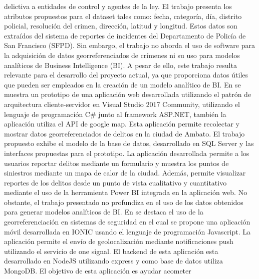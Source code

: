 delictiva a entidades de control y agentes de la ley. El trabajo presenta los atributos propuestos para el dataset tales como:
fecha, categoría, día, distrito policial, resolución del crimen, dirección, latitud y longitud. Estos datos son extraídos del
sistema de reportes de incidentes del Departamento de Policía de San Francisco (SFPD). Sin embargo, el trabajo no aborda el uso
de software para la adquisición de datos georreferenciados de crímenes ni su uso para modelos analíticos de Business Intelligence
(BI). A pesar de ello, este trabajo resulta relevante para el desarrollo del proyecto actual, ya que proporciona datos útiles que
pueden ser empleados en la creación de un modelo analítico de BI.
\bigbreak
En \cite{botto-tobarAppliedTechnologiesSecond2021} se muestra un prototipo de una aplicación web desarrollada
utilizando el patrón de arquitectura cliente-servidor en Visual Studio 2017 Community, utilizando el lenguaje de programación C\#
junto al framework ASP.NET, también la aplicación utiliza el API de google map. Esta aplicación permite recolectar y mostrar datos
georreferenciados de delitos en la ciudad de Ambato. El trabajo propuesto exhibe el modelo de la base de datos, desarrollado en SQL
Server  y las interfaces propuestas para el prototipo. La aplicación desarrollada permite a los usuarios reportar delitos mediante
un formulario y muestra los puntos de siniestros mediante un mapa de calor de la ciudad. Además, permite visualizar reportes de los
delitos desde un punto de vista cualitativo y cuantitativo mediante el uso de la herramienta Power BI integrada en la aplicación web.
No obstante, el trabajo presentado no profundiza en el uso de los datos obtenidos para generar modelos analíticos de BI.
\bigbreak
En \cite{chasichangoAplicacionMovilApoyo2022} se destaca el uso de la georreferenciación en sistemas de seguridad en el cual
se propone una aplicación móvil desarrollada en IONIC usando el lenguaje de programación Javascript. La aplicación permite el
envío de geolocalización mediante notificaciones push utilizando el servicio de one signal. El backend de esta aplicación esta
desarrollado en NodeJS utilizando express y como base de datos utiliza MongoDB. El objetivo de esta aplicación es ayudar acometer
